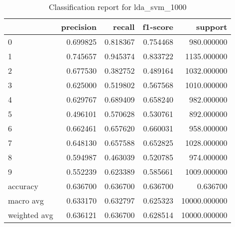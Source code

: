 \begin{table}[htb!]
\centering
\caption{Classification report for lda_svm_1000}
\label{tab:classification-report-lda_svm_1000}
\begin{tabular}{lrrrr}
\toprule
 & precision & recall & f1-score & support \\
\midrule
0 & 0.699825 & 0.818367 & 0.754468 & 980.000000 \\
1 & 0.745657 & 0.945374 & 0.833722 & 1135.000000 \\
2 & 0.677530 & 0.382752 & 0.489164 & 1032.000000 \\
3 & 0.625000 & 0.519802 & 0.567568 & 1010.000000 \\
4 & 0.629767 & 0.689409 & 0.658240 & 982.000000 \\
5 & 0.496101 & 0.570628 & 0.530761 & 892.000000 \\
6 & 0.662461 & 0.657620 & 0.660031 & 958.000000 \\
7 & 0.648130 & 0.657588 & 0.652825 & 1028.000000 \\
8 & 0.594987 & 0.463039 & 0.520785 & 974.000000 \\
9 & 0.552239 & 0.623389 & 0.585661 & 1009.000000 \\
accuracy & 0.636700 & 0.636700 & 0.636700 & 0.636700 \\
macro avg & 0.633170 & 0.632797 & 0.625323 & 10000.000000 \\
weighted avg & 0.636121 & 0.636700 & 0.628514 & 10000.000000 \\
\bottomrule
\end{tabular}
\end{table}
